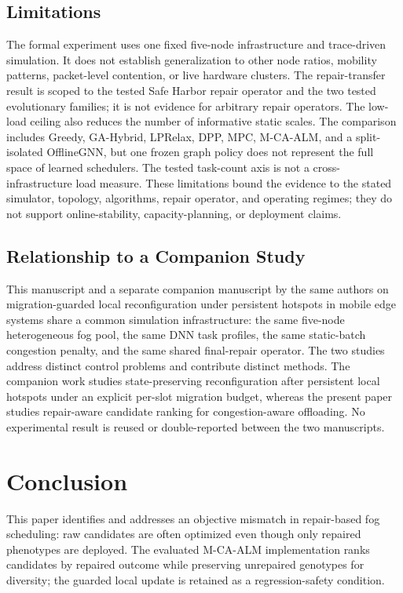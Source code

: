 \documentclass[pdflatex,sn-mathphys-num]{sn-jnl}
\begin{document}
\subsection{Limitations}
The formal experiment uses one fixed five-node infrastructure and trace-driven simulation. It does not establish generalization to other node ratios, mobility patterns, packet-level contention, or live hardware clusters. The repair-transfer result is scoped to the tested Safe Harbor repair operator and the two tested evolutionary families; it is not evidence for arbitrary repair operators. The low-load ceiling also reduces the number of informative static scales. The comparison includes Greedy, GA-Hybrid, LPRelax, DPP, MPC, M-CA-ALM, and a split-isolated OfflineGNN, but one frozen graph policy does not represent the full space of learned schedulers. The tested task-count axis is not a cross-infrastructure load measure. These limitations bound the evidence to the stated simulator, topology, algorithms, repair operator, and operating regimes; they do not support online-stability, capacity-planning, or deployment claims.

\subsection{Relationship to a Companion Study}
This manuscript and a separate companion manuscript by the same authors on
migration-guarded local reconfiguration under persistent hotspots in mobile
edge systems share a common simulation infrastructure: the
same five-node heterogeneous fog pool, the same DNN task profiles, the same
static-batch congestion penalty, and the same shared final-repair operator.
The two studies address distinct control problems and contribute distinct
methods. The companion work studies state-preserving reconfiguration after
persistent local hotspots under an explicit per-slot migration budget,
whereas the present paper studies repair-aware candidate ranking for
congestion-aware offloading. No experimental result is reused or
double-reported between the two manuscripts.



\section{Conclusion}

This paper identifies and addresses an objective mismatch in repair-based fog scheduling: raw candidates are often optimized even though only repaired phenotypes are deployed. The evaluated M-CA-ALM implementation ranks candidates by repaired outcome while preserving unrepaired genotypes for diversity; the guarded local update is retained as a regression-safety condition.
\end{document}
